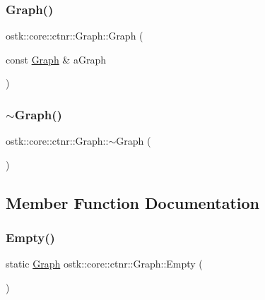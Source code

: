 \subsubsection{\texorpdfstring{Graph()}{Graph()}\hspace{0.1cm}{\footnotesize\ttfamily [2/2]}}
{\footnotesize\ttfamily ostk\+::core\+::ctnr\+::\+Graph\+::\+Graph (\begin{DoxyParamCaption}\item[{const \hyperlink{classostk_1_1core_1_1ctnr_1_1_graph}{Graph} \&}]{a\+Graph }\end{DoxyParamCaption})}

\mbox{\label{classostk_1_1core_1_1ctnr_1_1_graph_a6ec509e6c553de5274d98d4758145044}} 
\subsubsection{\texorpdfstring{$\sim$\+Graph()}{~Graph()}}
{\footnotesize\ttfamily ostk\+::core\+::ctnr\+::\+Graph\+::$\sim$\+Graph (\begin{DoxyParamCaption}{ }\end{DoxyParamCaption})}



\subsection{Member Function Documentation}
\mbox{\label{classostk_1_1core_1_1ctnr_1_1_graph_ab3aa9db7f8faf8227172fbb33d728cbc}} 
\subsubsection{\texorpdfstring{Empty()}{Empty()}}
{\footnotesize\ttfamily static \hyperlink{classostk_1_1core_1_1ctnr_1_1_graph}{Graph} ostk\+::core\+::ctnr\+::\+Graph\+::\+Empty (\begin{DoxyParamCaption}{ }\end{DoxyParamCaption})\hspace{0.3cm}{\ttfamily [static]}}

